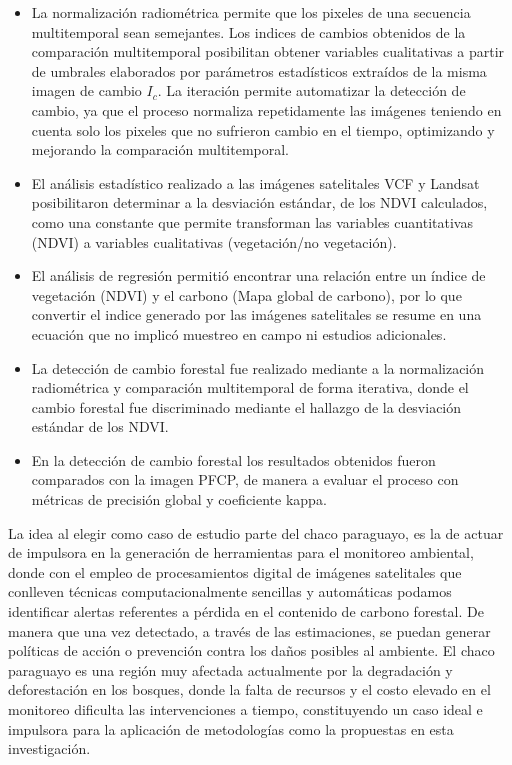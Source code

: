 \begin{itemize} 
\item La normalizaci\'on radiom\'etrica permite que los pixeles de una secuencia multitemporal sean semejantes. Los indices de cambios obtenidos de la comparaci\'on multitemporal posibilitan obtener variables cualitativas a partir de umbrales elaborados por par\'ametros estad\'isticos extra\'idos de la misma imagen de cambio $ I_{c} $. La iteraci\'on permite automatizar la detecci\'on de cambio, ya que el proceso normaliza repetidamente las im\'agenes teniendo en cuenta solo los pixeles que no sufrieron cambio en el tiempo, optimizando y mejorando la comparaci\'on multitemporal.
\item El an\'alisis estad\'istico realizado a las im\'agenes satelitales VCF y Landsat posibilitaron determinar a la desviaci\'on est\'andar, de los NDVI calculados, como una constante que permite transforman las variables cuantitativas (NDVI) a variables cualitativas (vegetaci\'on/no vegetaci\'on).
\item El an\'alisis de regresi\'on permiti\'o encontrar una relaci\'on entre un \'indice de vegetaci\'on (NDVI) y el carbono (Mapa global de carbono), por lo que convertir el indice generado por las im\'agenes satelitales se resume en una ecuaci\'on que no implic\'o muestreo en campo ni estudios adicionales.
\item La detecci\'on de cambio forestal fue realizado mediante a la normalizaci\'on radiom\'etrica y comparaci\'on multitemporal de forma iterativa, donde el cambio forestal fue discriminado mediante el hallazgo de la desviaci\'on est\'andar de los NDVI. 
\item En la detecci\'on de cambio forestal los resultados obtenidos fueron comparados con la imagen PFCP, de manera a evaluar el proceso con m\'etricas de precisi\'on global y coeficiente kappa.
\end{itemize}
La idea al elegir como caso de estudio parte del chaco paraguayo, es la de actuar de impulsora en la generaci\'on de herramientas para el monitoreo ambiental, donde con el empleo de procesamientos digital de im\'agenes satelitales que conlleven t\'ecnicas computacionalmente sencillas y autom\'aticas podamos identificar alertas referentes a p\'erdida en el contenido de carbono forestal. De manera que una vez detectado, a trav\'es de las estimaciones, se puedan generar pol\'iticas de acci\'on o prevenci\'on contra los da\~{n}os posibles al ambiente. El chaco paraguayo es una regi\'on muy afectada actualmente por la degradaci\'on y deforestaci\'on en los bosques, donde la falta de recursos y el costo  elevado en el monitoreo dificulta las intervenciones a tiempo, constituyendo un caso ideal e impulsora para la aplicaci\'on de metodolog\'ias como la propuestas en esta investigaci\'on.

